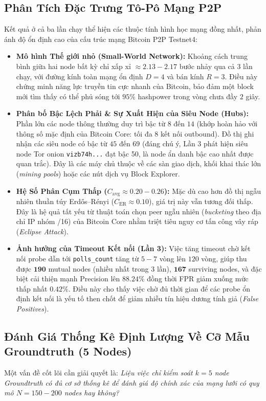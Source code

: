 \documentclass[11pt,a4paper]{article}
\begin{document}
\subsection{Phân Tích Đặc Trưng Tô-Pô Mạng P2P}
Kết quả ở cả ba lần chạy thể hiện các thuộc tính hình học mạng đồng nhất, phản ánh độ ổn định cao của cấu trúc mạng Bitcoin P2P Testnet4:
\begin{itemize}
    \item \textbf{Mô hình Thế giới nhỏ (Small-World Network):} Khoảng cách trung bình giữa hai node bất kỳ chỉ xấp xỉ $\approx 2.13 - 2.17$ bước nhảy qua cả 3 lần chạy, với đường kính toàn mạng ổn định $D=4$ và bán kính $R=3$. Điều này chứng minh năng lực truyền tin cực nhanh của Bitcoin, bảo đảm một block mới tìm thấy có thể phủ sóng tới $95\%$ hashpower trong vòng chưa đầy $2$ giây.
    \item \textbf{Phân bố Bậc Lệch Phải \& Sự Xuất Hiện của Siêu Node (Hubs):} Phần lớn các node thông thường duy trì bậc từ $8$ đến $14$ (khớp hoàn hảo với thông số mặc định của Bitcoin Core: tối đa 8 kết nối outbound). Đồ thị ghi nhận các siêu node có bậc từ $45$ đến $69$ (đáng chú ý, Lần 3 phát hiện siêu node Tor onion \texttt{vizb74h...} đạt bậc 50, là node ẩn danh bậc cao nhất được quan trắc). Đây là các máy chủ thuộc về các sàn giao dịch, khối khai thác lớn (\textit{mining pools}) hoặc các nút dịch vụ Block Explorer.
    \item \textbf{Hệ Số Phân Cụm Thấp ($C_{\text{avg}} \approx 0.20 - 0.26$):} Mặc dù cao hơn đồ thị ngẫu nhiên thuần túy Erd\H{o}s--R\'enyi ($C_{\text{ER}} \approx 0.10$), giá trị này vẫn tương đối thấp. Đây là hệ quả tất yếu từ thuật toán chọn peer ngẫu nhiên (\textit{bucketing} theo địa chỉ IP nhóm /16) của Bitcoin Core nhằm triệt tiêu nguy cơ tấn công vây ráp (\textit{Eclipse Attack}).
    \item \textbf{Ảnh hưởng của Timeout Kết nối (Lần 3):} Việc tăng timeout chờ kết nối probe dẫn tới \texttt{polls\_count} tăng từ $5 - 7$ vòng lên $120$ vòng, giúp thu được $\mathbf{190}$ mutual nodes (nhiều nhất trong 3 lần), $\mathbf{167}$ surviving nodes, và đặc biệt cải thiện mạnh Precision lên $\mathbf{88.24\%}$ đồng thời FPR giảm xuống mức thấp nhất $\mathbf{0.42\%}$. Điều này cho thấy việc chờ đủ thời gian để các probe ổn định kết nối là yếu tố then chốt để giảm nhiễu tín hiệu dương tính giả (\textit{False Positives}).
\end{itemize}

\subsection{Đánh Giá Thống Kê Định Lượng Về Cỡ Mẫu Groundtruth (5 Nodes)}
Một vấn đề cốt lõi cần giải quyết là: \textit{Liệu việc chỉ kiểm soát $k = 5$ node Groundtruth có đủ cơ sở thống kê để đánh giá độ chính xác của mạng lưới có quy mô $N = 150 - 200$ nodes hay không?}
\end{document}
